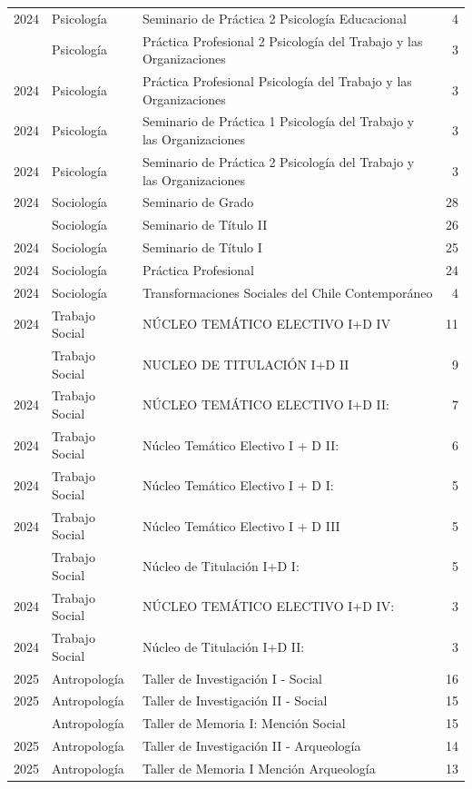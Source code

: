 \documentclass[
  spanish,
  a4paper,
  oneside]{scrbook}
\begin{document}
\begin{longtable}[t]{lllr}
2024 & Psicología & Seminario de Práctica 2 Psicología Educacional & 4\\
\addlinespace
2024 & Psicología & Práctica Profesional 2 Psicología del Trabajo y las Organizaciones & 3\\
2024 & Psicología & Práctica Profesional Psicología del Trabajo y las Organizaciones & 3\\
2024 & Psicología & Seminario de Práctica 1 Psicología del Trabajo y las Organizaciones & 3\\
2024 & Psicología & Seminario de Práctica 2 Psicología del Trabajo y las Organizaciones & 3\\
2024 & Sociología & Seminario de Grado & 28\\
\addlinespace
2024 & Sociología & Seminario de Título II & 26\\
2024 & Sociología & Seminario de Título I & 25\\
2024 & Sociología & Práctica Profesional & 24\\
2024 & Sociología & Transformaciones Sociales del Chile Contemporáneo & 4\\
2024 & Trabajo Social & NÚCLEO TEMÁTICO ELECTIVO I+D IV & 11\\
\addlinespace
2024 & Trabajo Social & NUCLEO DE TITULACIÓN I+D II & 9\\
2024 & Trabajo Social & NÚCLEO TEMÁTICO ELECTIVO I+D II: & 7\\
2024 & Trabajo Social & Núcleo Temático Electivo I + D II: & 6\\
2024 & Trabajo Social & Núcleo Temático Electivo I + D I: & 5\\
2024 & Trabajo Social & Núcleo Temático Electivo I + D III & 5\\
\addlinespace
2024 & Trabajo Social & Núcleo de Titulación I+D I: & 5\\
2024 & Trabajo Social & NÚCLEO TEMÁTICO ELECTIVO I+D IV: & 3\\
2024 & Trabajo Social & Núcleo de Titulación I+D II: & 3\\
2025 & Antropología & Taller de Investigación I - Social & 16\\
2025 & Antropología & Taller de Investigación II - Social & 15\\
\addlinespace
2025 & Antropología & Taller de Memoria I: Mención Social & 15\\
2025 & Antropología & Taller de Investigación II - Arqueología & 14\\
2025 & Antropología & Taller de Memoria I Mención Arqueología & 13\\

\end{longtable}
\end{document}
